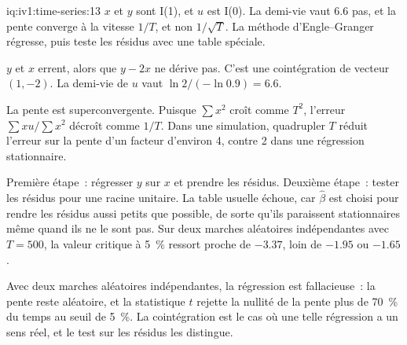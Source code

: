 \begin{solution}{iq:iv1:time-series:13}
$x$ et $y$ sont I(1), et $u$ est I(0). La demi-vie vaut $6.6$ pas, et la pente converge à la vitesse $1/T$, et non $1/\sqrt{T}$. La méthode d'Engle--Granger régresse, puis teste les résidus avec une table spéciale.

$y$ et $x$ errent, alors que $y - 2x$ ne dérive pas. C'est une cointégration de vecteur $(1, -2)$. La demi-vie de $u$ vaut $\ln 2/(-\ln 0.9) = 6.6$.

La pente est superconvergente. Puisque $\sum x^2$ croît comme $T^2$, l'erreur $\sum xu/\sum x^2$ décroît comme $1/T$. Dans une simulation, quadrupler $T$ réduit l'erreur sur la pente d'un facteur d'environ 4, contre 2 dans une régression stationnaire.

Première étape~: régresser $y$ sur $x$ et prendre les résidus. Deuxième étape~: tester les résidus pour une racine unitaire. La table usuelle échoue, car $\hat{\beta}$ est choisi pour rendre les résidus aussi petits que possible, de sorte qu'ils paraissent stationnaires même quand ils ne le sont pas. Sur deux marches aléatoires indépendantes avec $T = 500$, la valeur critique à 5~\% ressort proche de $-3.37$, loin de $-1.95$ ou $-1.65$.

Avec deux marches aléatoires indépendantes, la régression est fallacieuse~: la pente reste aléatoire, et la statistique $t$ rejette la nullité de la pente plus de 70~\% du temps au seuil de 5~\%. La cointégration est le cas où une telle régression a un sens réel, et le test sur les résidus les distingue.



\end{solution}

